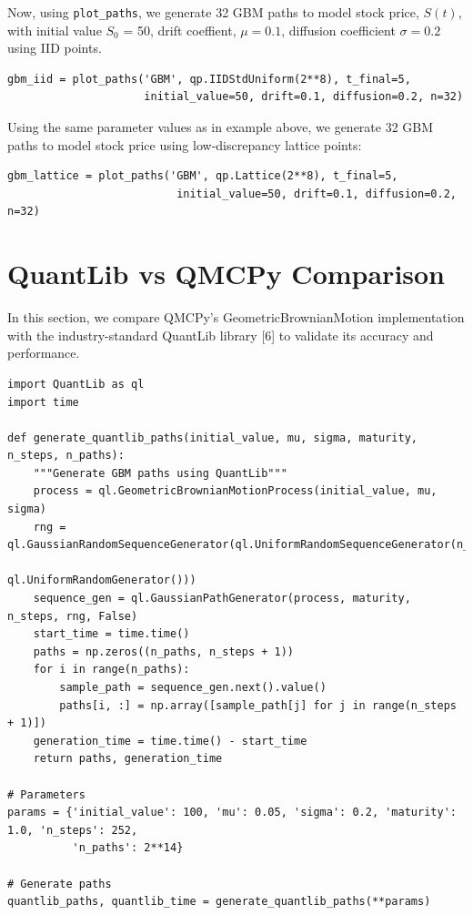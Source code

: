 \documentclass{article}
\begin{document}
Now, using \texttt{plot\_paths}, we generate 32 GBM paths to model stock price, $S(t)$, with initial value $S_0$ = 50, drift coeffient, $\mu = 0.1$, diffusion coefficient $\sigma = 0.2$ using IID points.


\begin{verbatim}
gbm_iid = plot_paths('GBM', qp.IIDStdUniform(2**8), t_final=5, 
                     initial_value=50, drift=0.1, diffusion=0.2, n=32)
\end{verbatim}



Using the same parameter values as in example above, we generate 32 GBM paths to model stock price using low-discrepancy lattice points:

\begin{verbatim}
gbm_lattice = plot_paths('GBM', qp.Lattice(2**8), t_final=5, 
                          initial_value=50, drift=0.1, diffusion=0.2, n=32)
\end{verbatim}



\section{QuantLib vs QMCPy Comparison}

In this section, we compare QMCPy's GeometricBrownianMotion implementation with the industry-standard QuantLib library [6] to validate its accuracy and performance.


\begin{verbatim}
import QuantLib as ql
import time

def generate_quantlib_paths(initial_value, mu, sigma, maturity, n_steps, n_paths):
    """Generate GBM paths using QuantLib"""
    process = ql.GeometricBrownianMotionProcess(initial_value, mu, sigma)
    rng = ql.GaussianRandomSequenceGenerator(ql.UniformRandomSequenceGenerator(n_steps, 
                                             ql.UniformRandomGenerator()))
    sequence_gen = ql.GaussianPathGenerator(process, maturity, n_steps, rng, False)
    start_time = time.time()
    paths = np.zeros((n_paths, n_steps + 1))
    for i in range(n_paths):
        sample_path = sequence_gen.next().value()
        paths[i, :] = np.array([sample_path[j] for j in range(n_steps + 1)])
    generation_time = time.time() - start_time
    return paths, generation_time

# Parameters
params = {'initial_value': 100, 'mu': 0.05, 'sigma': 0.2, 'maturity': 1.0, 'n_steps': 252, 
          'n_paths': 2**14}

# Generate paths 
quantlib_paths, quantlib_time = generate_quantlib_paths(**params)
\end{verbatim}
\end{document}
